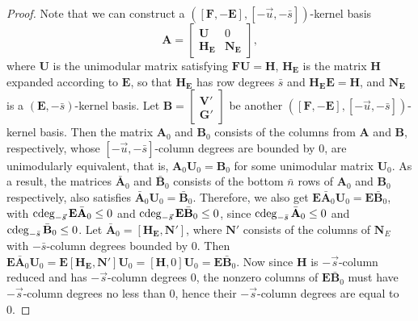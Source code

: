 \begin{proof}
Note that we can construct a $\left(\left[\mathbf{F},-\mathbf{E}\right],\left[-\vec{u},-\bar{s}\right]\right)$-kernel
basis 
\[
\mathbf{A}=\begin{bmatrix}\mathbf{U} & 0\\
\mathbf{H}_{\mathbf{E}} & \mathbf{N}_{\mathbf{E}}
\end{bmatrix},
\]
where $\mathbf{U}$ is the unimodular matrix satisfying $\mathbf{F}\mathbf{U}=\mathbf{H}$,
$\mathbf{H}_{\mathbf{E}}$ is the matrix $\mathbf{H}$ expanded according
to $\mathbf{E}$, so that $\mathbf{H}_{\mathbf{E}}$ has row degrees
$\bar{s}$ and $\mathbf{H}_{\mathbf{E}}\mathbf{E}=\mathbf{H}$, and
$\mathbf{N}_{\mathbf{E}}$ is a $\left(\mathbf{E},-\bar{s}\right)$-kernel
basis. Let $\mathbf{B}=\begin{bmatrix}\mathbf{V}'\\
\mathbf{G}'
\end{bmatrix}$ be another $\left(\left[\mathbf{F},-\mathbf{E}\right],\left[-\vec{u},-\bar{s}\right]\right)$-kernel
basis. Then the matrix $\mathbf{A}_{0}$ and $\mathbf{B}_{0}$ consists
of the columns from $\mathbf{A}$ and $\mathbf{B}$, respectively,
whose $\left[-\vec{u},-\bar{s}\right]$-column degrees are bounded
by $0$, are unimodularly equivalent, that is, $\mathbf{A}_{0}\mathbf{U}_{0}=\mathbf{B}_{0}$
for some unimodular matrix $\mathbf{U}_{0}$. As a result, the matrices
$\bar{\mathbf{A}}_{0}$ and $\bar{\mathbf{B}}_{0}$ consists of the
bottom $\bar{n}$ rows of $\mathbf{A}_{0}$ and $\mathbf{B}_{0}$
respectively, also satisfies $\bar{\mathbf{A}}_{0}\mathbf{U}_{0}=\bar{\mathbf{B}}_{0}$.
Therefore, we also get $\mathbf{E}\bar{\mathbf{A}}_{0}\mathbf{U}_{0}=\mathbf{E}\bar{\mathbf{B}}_{0}$,
with $\cdeg_{-\vec{s}}\mathbf{E}\bar{\mathbf{A}}_{0}\le0$ and $\cdeg_{-\vec{s}}\mathbf{E}\bar{\mathbf{B}}_{0}\le0$,
since $\cdeg_{-\bar{s}}\bar{\mathbf{A}}_{0}\le0$ and $\cdeg_{-\bar{s}}\bar{\mathbf{B}}_{0}\le0$.
Let $\bar{\mathbf{A}}_{0}=\left[\mathbf{H}_{\mathbf{E}},\mathbf{N}'\right]$,
where $\mathbf{N}'$ consists of the columns of $\mathbf{N}_{E}$
with $-\bar{s}$-column degrees bounded by 0. Then $\mathbf{E}\bar{\mathbf{A}}_{0}\mathbf{U}_{0}=\mathbf{E}\left[\mathbf{H}_{\mathbf{E}},\mathbf{N}'\right]\mathbf{U}_{0}=\left[\mathbf{H},0\right]\mathbf{U}_{0}=\mathbf{E}\bar{\mathbf{B}}_{0}$.
Now since $\mathbf{H}$ is $-\vec{s}$-column reduced and has $-\vec{s}$-column
degrees $0$, the nonzero columns of $\mathbf{E}\bar{\mathbf{B}}_{0}$
must have $-\vec{s}$-column degrees no less than $0$, hence their
$-\vec{s}$-column degrees are equal to 0.
\end{proof}
